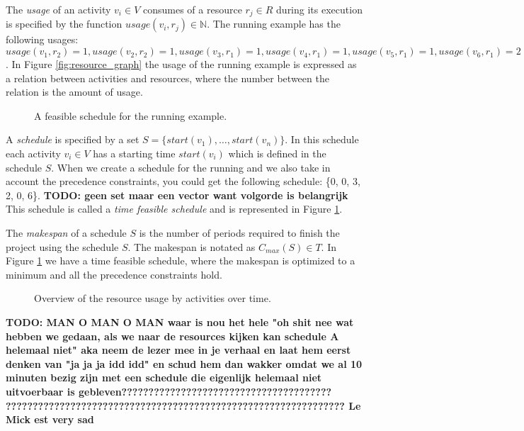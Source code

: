 \documentclass{article}
\theoremstyle{definition}
\newcommand{\inputtikz}[1]{}
\newcommand{\TODO}[1]{{\color{red}\textbf{TODO: #1}}}
\newcommand{\res}[0]{\ensuremath{R}} %
\newcommand{\usage}[2]{\ensuremath{usage(v_{#1}, r_{#2})}} %
\newcommand{\start}[1]{\ensuremath{start(v_{#1})}} %
\newcommand{\makespan}[1]{\ensuremath{C_{max}(#1)}} %
\begin{document}
The \emph{usage} of an activity $v_i \in V$ consumes of a resource $r_j \in \res$ during its execution is specified by the function $\usage{i}{j} \in \mathbb{N}$.
The running example has the following usages: $\usage{1}{2} = 1, \usage{2}{2} = 1, \usage{3}{1} = 1, \usage{4}{1} = 1, \usage{5}{1} = 1, \usage{6}{1} = 2$.
In Figure \ref{fig:resource_graph} the usage of the running example is expressed as a relation between activities and resources, where the number between the relation is the amount of usage.

\begin{figure}[h]
	\centering
	\inputtikz{schedule_feasible}
	\caption{A feasible schedule for the running example. }
	\label{fig:time_feasible_schedule}
\end{figure}

A \emph{schedule} is specified by a set $S = \{\start{1}, \ldots, \start{n}\}$.
In this schedule each activity $v_i \in V$ has a starting time $\start{i}$ which is defined in the schedule $S$.
When we create a schedule for the running and we also take in account the precedence constraints, you could get the following schedule:
\{0, 0, 3, 2, 0, 6\}. \TODO{geen set maar een vector want volgorde is belangrijk}
This schedule is called a \emph{time feasible schedule} and is represented in Figure \ref{fig:time_feasible_schedule}. 

The \emph{makespan} of a schedule $S$ is the number of periods required to finish the project using the schedule $S$. The makespan is notated as $\makespan{S} \in T$.
In Figure \ref{fig:time_feasible_schedule} we have a time feasible schedule, where the makespan is optimized to a minimum and all the precedence constraints hold.

\begin{figure}[h]
	\centering
	\inputtikz{schedule_feasible_profile}
	\caption{Overview of the resource usage by activities over time. }
	\label{fig:feasible_schedule}
\end{figure}

\TODO{MAN O MAN O MAN waar is nou het hele "oh shit nee wat hebben we gedaan, als we naar de resources kijken kan schedule A helemaal niet" aka neem de lezer mee in je verhaal en laat hem eerst denken van "ja ja ja idd idd" en schud hem dan wakker omdat we al 10 minuten bezig zijn met een schedule die eigenlijk helemaal niet uitvoerbaar is gebleven???????????????????????????????????????
??????????????????????????????????????????????????????????????? Le Mick est very sad}
\end{document}

